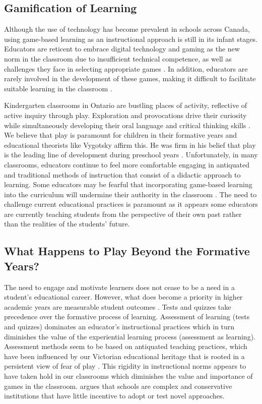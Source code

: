 \documentclass[10pt]{article}
\begin{document}
\subsection{Gamification of Learning}

Although the use of technology has become prevalent in schools across Canada, using game-based learning as an instructional approach is still in its infant stages. Educators are reticent to embrace digital technology and gaming as the new norm in the classroom due to insufficient technical competence, as well as challenges they face in selecting appropriate games \citep{jaaska2022teachers,molin2017role}. In addition, educators are rarely involved in the development of these games, making it difficult to facilitate suitable learning in the classroom \citep{molin2017role}. 

Kindergarten classrooms in Ontario are bustling places of activity, reflective of active inquiry through play. Exploration and provocations drive their curiosity while simultaneously developing their oral language and critical thinking skills \citep{kindergartencurriculum}. We believe that play is paramount for children in their formative years and educational theorists like Vygotsky affirm this. He was firm in his belief that play is the leading line of development during preschool years \citep{vygotsky1967play}. Unfortunately, in many classrooms, educators continue to feel more comfortable engaging in antiquated and traditional methods of instruction that consist of a didactic approach to learning. Some educators may be fearful that incorporating game-based learning into the curriculum will undermine their authority in the classroom \citep{jaaska2022teachers,chee2014facilitating,jong2016teachers}. The need to challenge current educational practices is paramount as it appears some educators are currently teaching students from the perspective of their own past rather than the realities of the students’ future. 

\subsection{What Happens to Play Beyond the Formative Years?}

The need to engage and motivate learners does not cease to be a need in a student’s educational career. However, what does become a priority in higher academic years are measurable student outcomes \citep{ball2012politics,shore2010beyond,leather2021pedagogy}. Tests and quizzes take precedence over the formative process of learning. Assessment of learning (tests and quizzes) dominates an educator’s instructional practices which in turn diminishes the value of the experiential learning process (assessment as learning). Assessment methods seem to be based on antiquated teaching practices, which have been influenced by our Victorian educational heritage that is rooted in a persistent view of fear of play \citep{wood2013play}. This rigidity in instructional norms appears to have taken hold in our classrooms which diminishes the value and importance of games in the classroom. \citet{reich2020failure} argues that schools are complex and conservative institutions that have little incentive to adopt or test novel approaches. 
\end{document}
